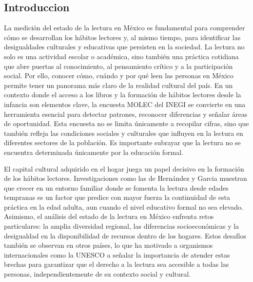\documentclass[aps,reprint]{revtex4-2}
\begin{document}
\subsection{Introduccion}
La medición del estado de la lectura en México es fundamental para comprender cómo se desarrollan los hábitos lectores y, al mismo tiempo, para identificar las desigualdades culturales y educativas que persisten en la sociedad. La lectura no solo es una actividad escolar o académica, sino también una práctica cotidiana que abre puertas al conocimiento, al pensamiento crítico y a la participación social. Por ello, conocer cómo, cuándo y por qué leen las personas en México permite tener un panorama más claro de la realidad cultural del país.\cite{noauthor_modulo_2020}
En un contexto donde el acceso a los libros y la formación de hábitos lectores desde la infancia son elementos clave, la encuesta MOLEC del INEGI se convierte en una herramienta esencial para detectar patrones, reconocer diferencias y señalar áreas de oportunidad. Esta encuesta no se limita únicamente a recopilar cifras, sino que también refleja las condiciones sociales y culturales que influyen en la lectura en diferentes sectores de la población.\cite{noauthor_modulo_2020}
Es importante subrayar que la lectura no se encuentra determinada únicamente por la educación formal. 

El capital cultural adquirido en el hogar juega un papel decisivo en la formación de los hábitos lectores. Investigaciones como las de Hernández\cite{hernandez_impacto_2020} y Garcia\cite{garcia_lectura_nodate} muestran que crecer en un entorno familiar donde se fomenta la lectura desde edades tempranas es un factor que predice con mayor fuerza la continuidad de esta práctica en la edad adulta, aun cuando el nivel educativo formal no sea elevado.
Asimismo, el análisis del estado de la lectura en México enfrenta retos particulares: la amplia diversidad regional, las diferencias socioeconómicas y la desigualdad en la disponibilidad de recursos dentro de los hogares. Estos desafíos también se observan en otros países, lo que ha motivado a organismos internacionales como la UNESCO a señalar la importancia de atender estas brechas para garantizar que el derecho a la lectura sea accesible a todas las personas, independientemente de su contexto social y cultural.\cite{noauthor_informe_2021}
\end{document}
